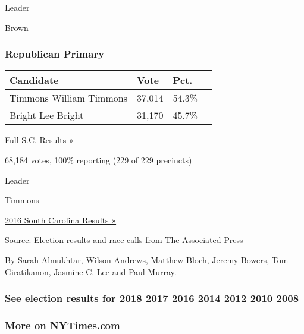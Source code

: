 Leader

 Brown

\hypertarget{republican-primary}{%
\subsubsection{Republican Primary}\label{republican-primary}}

\begin{longtable}[]{@{}llll@{}}
\toprule
Candidate & Vote & Pct. &\tabularnewline
\midrule
\endhead
 Timmons William Timmons & 37,014 & 54.3\% &\tabularnewline
 Bright Lee Bright & 31,170 & 45.7\% &\tabularnewline
\bottomrule
\end{longtable}

\href{https://www.nytimes3xbfgragh.onion/elections/results/south-carolina}{Full
S.C. Results »}

68,184 votes, 100\% reporting (229 of 229 precincts)

Leader

 Timmons

\href{https://www.nytimes3xbfgragh.onion/elections/results/south-carolina}{2016
South Carolina Results »}

Source: Election results and race calls from The Associated Press

By Sarah Almukhtar, Wilson Andrews, Matthew Bloch, Jeremy Bowers, Tom
Giratikanon, Jasmine C. Lee and Paul Murray.

\hypertarget{see-election-results-for-2018-2017-2016-2014-2012-2010-2008}{%
\subsubsection{\texorpdfstring{See election results for
\href{https://www.nytimes3xbfgragh.onion/interactive/2018/us/elections/calendar-primary-results.html}{2018}
\href{https://www.nytimes3xbfgragh.onion/interactive/2017/us/elections/election-calendar.html}{2017}
\href{https://www.nytimes3xbfgragh.onion/elections/results/president}{2016}
\href{https://www.nytimes3xbfgragh.onion/elections/2014/results/senate}{2014}
\href{https://www.nytimes3xbfgragh.onion/elections/2012/results/president.html}{2012}
\href{https://www.nytimes3xbfgragh.onion/elections/2010/results/senate.html}{2010}
\href{https://www.nytimes3xbfgragh.onion/elections/2008/results/president/map.html}{2008}}{See election results for 2018 2017 2016 2014 2012 2010 2008}}\label{see-election-results-for-2018-2017-2016-2014-2012-2010-2008}}

\hypertarget{more-on-nytimescom}{%
\subsubsection{More on NYTimes.com}\label{more-on-nytimescom}}

